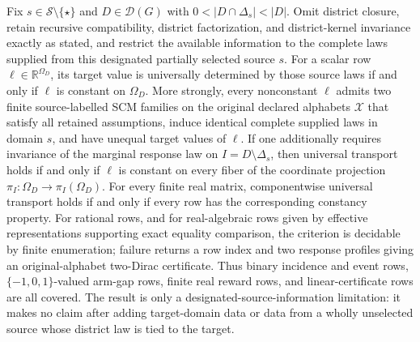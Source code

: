 Fix \(s\in\mathcal S\setminus\{\star\}\) and \(D\in\mathcal D(G)\) with \(0<|D\cap\Delta_s|<|D|\).  Omit district closure, retain recursive compatibility, district factorization, and district-kernel invariance exactly as stated, and restrict the available information to the complete laws supplied from this designated partially selected source \(s\).  For a scalar row \(\ell\in\mathbb R^{\Omega_D}\), its target value is universally determined by those source laws if and only if \(\ell\) is constant on \(\Omega_D\).  More strongly, every nonconstant \(\ell\) admits two finite source-labelled SCM families on the original declared alphabets \(\mathcal X\) that satisfy all retained assumptions, induce identical complete supplied laws in domain \(s\), and have unequal target values of \(\ell\).  If one additionally requires invariance of the marginal response law on \(I=D\setminus\Delta_s\), then universal transport holds if and only if \(\ell\) is constant on every fiber of the coordinate projection \(\pi_I:\Omega_D\to\pi_I(\Omega_D)\).  For every finite real matrix, componentwise universal transport holds if and only if every row has the corresponding constancy property.  For rational rows, and for real-algebraic rows given by effective representations supporting exact equality comparison, the criterion is decidable by finite enumeration; failure returns a row index and two response profiles giving an original-alphabet two-Dirac certificate.  Thus binary incidence and event rows, \(\{-1,0,1\}\)-valued arm-gap rows, finite real reward rows, and linear-certificate rows are all covered.  The result is only a designated-source-information limitation: it makes no claim after adding target-domain data or data from a wholly unselected source whose district law is tied to the target.